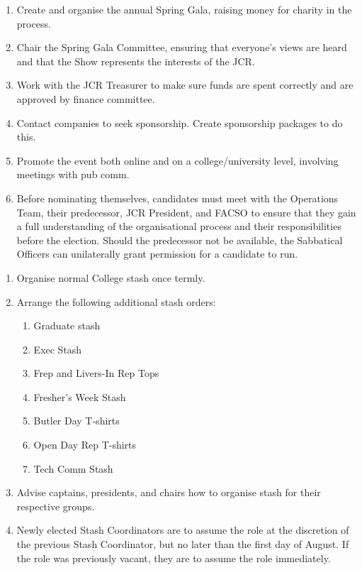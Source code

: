 \begin{enumerate}
    \item Create and organise the annual Spring Gala, raising money for charity in the process.
    \item Chair the Spring Gala Committee, ensuring that everyone’s views are heard and that the Show represents the interests of the JCR.
    \item Work with the JCR Treasurer to make sure funds are spent correctly and are approved by finance committee.
    \item Contact companies to seek sponsorship. Create sponsorship packages to do this. 
    \item Promote the event both online and on a college/university level, involving meetings with pub comm.
    \item Before nominating themselves, candidates must meet with the Operations Team, their predecessor, JCR President, and FACSO to ensure that they gain a full understanding of the organisational process and their responsibilities before the election. Should the predecessor not be available, the Sabbatical Officers can unilaterally grant permission for a candidate to run. 
    
\end{enumerate}

\begin{enumerate}
    \item Organise normal College stash once termly.
    \item Arrange the following additional stash orders:
    \begin{enumerate}
        \item Graduate stash
        \item Exec Stash 
        \item Frep and Livers-In Rep Tops 
        \item Fresher’s Week Stash 
        \item Butler Day T-shirts 
        \item Open Day Rep T-shirts 
        \item Tech Comm Stash
    \end{enumerate}
    \item Advise captains, presidents, and chairs how to organise stash for their respective groups.
    \item Newly elected Stash Coordinators are to assume the role at the discretion of the previous Stash Coordinator, but no later than the first day of August. If the role was previously vacant, they are to assume the role immediately.
    
\end{enumerate}

